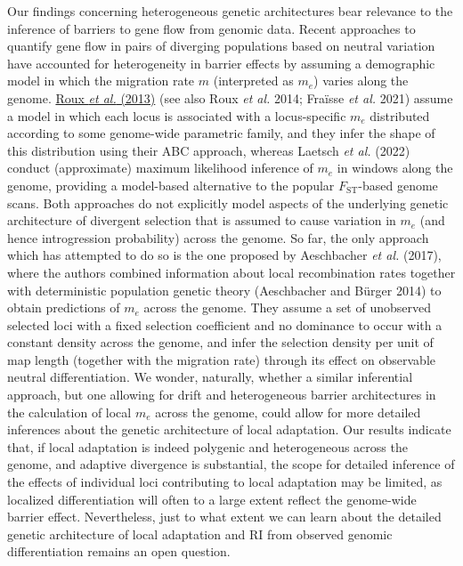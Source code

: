 \documentclass[
  11pt,
]{article}
\begin{document}
Our findings concerning heterogeneous genetic architectures bear
relevance to the inference of barriers to gene flow from genomic data.
Recent approaches to quantify gene flow in pairs of diverging
populations based on neutral variation have accounted for heterogeneity
in barrier effects by assuming a demographic model in which the
migration rate \(m\) (interpreted as \(m_e\)) varies along the genome.
\href{@roux2013}{Roux \emph{et al.} (2013)} (see also Roux \emph{et al.}
2014; Fraïsse \emph{et al.} 2021) assume a model in which each locus is
associated with a locus-specific \(m_e\) distributed according to some
genome-wide parametric family, and they infer the shape of this
distribution using their ABC approach, whereas Laetsch \emph{et al.}
(2022) conduct (approximate) maximum likelihood inference of \(m_e\) in
windows along the genome, providing a model-based alternative to the
popular \(F_{\mathrm{ST}}\)-based genome scans. Both approaches do not
explicitly model aspects of the underlying genetic architecture of
divergent selection that is assumed to cause variation in \(m_e\) (and
hence introgression probability) across the genome. So far, the only
approach which has attempted to do so is the one proposed by Aeschbacher
\emph{et al.} (2017), where the authors combined information about local
recombination rates together with deterministic population genetic
theory (Aeschbacher and Bürger 2014) to obtain predictions of \(m_e\)
across the genome. They assume a set of unobserved selected loci with a
fixed selection coefficient and no dominance to occur with a constant
density across the genome, and infer the selection density per unit of
map length (together with the migration rate) through its effect on
observable neutral differentiation. We wonder, naturally, whether a
similar inferential approach, but one allowing for drift and
heterogeneous barrier architectures in the calculation of local \(m_e\)
across the genome, could allow for more detailed inferences about the
genetic architecture of local adaptation. Our results indicate that, if
local adaptation is indeed polygenic and heterogeneous across the
genome, and adaptive divergence is substantial, the scope for detailed
inference of the effects of individual loci contributing to local
adaptation may be limited, as localized differentiation will often to a
large extent reflect the genome-wide barrier effect. Nevertheless, just
to what extent we can learn about the detailed genetic architecture of
local adaptation and RI from observed genomic differentiation remains an
open question.
\end{document}
